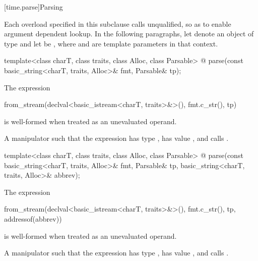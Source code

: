 %

[time.parse]{Parsing}

%

\pnum
Each  overload specified in this subclause
calls  unqualified,
so as to enable argument dependent lookup.
In the following paragraphs,
let  denote an object of type  and
let  be ,
where  and  are template parameters in that context.

\begin{itemdecl}
template<class charT, class traits, class Alloc, class Parsable>
  @\unspec@
    parse(const basic_string<charT, traits, Alloc>& fmt, Parsable& tp);
\end{itemdecl}

\begin{itemdescr}
\pnum
\constraints
The expression
\begin{codeblock}
from_stream(declval<basic_istream<charT, traits>&>(), fmt.c_str(), tp)
\end{codeblock}
is well-formed when treated as an unevaluated operand.

\pnum
\returns
A manipulator such that
the expression 
has type ,
has value , and
calls .
\end{itemdescr}

\begin{itemdecl}
template<class charT, class traits, class Alloc, class Parsable>
  @\unspec@
    parse(const basic_string<charT, traits, Alloc>& fmt, Parsable& tp,
          basic_string<charT, traits, Alloc>& abbrev);
\end{itemdecl}

\begin{itemdescr}
\pnum
\constraints
The expression
\begin{codeblock}
from_stream(declval<basic_istream<charT, traits>&>(), fmt.c_str(), tp, addressof(abbrev))
\end{codeblock}
is well-formed when treated as an unevaluated operand.

\pnum
\returns
A manipulator such that
the expression 
has type ,
has value , and
calls .
\end{itemdescr}

